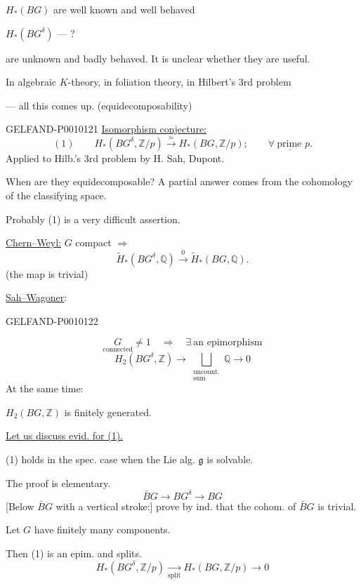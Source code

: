 $H_*(BG)$ are well known and well behaved

$H_*(BG^\delta)$ --- ?

are unknown and badly behaved. It is unclear whether they are useful.

In algebraic $K$-theory, in foliation theory, in Hilbert’s 3rd problem

--- all this comes up. \qquad (equidecomposability)


\begin{GelfandAdjacentEvidence}{GELFAND-P001012}{1}
\underline{Isomorphism conjecture:}
\[
(1)\qquad H_*(BG^\delta,\mathbb Z/p)\overset{\simeq}{\longrightarrow}
H_*(BG,\mathbb Z/p);\qquad \underline{\forall\ \text{prime }p.}
\]
Applied to Hilb.’s 3rd problem by H. Sah, Dupont.

When are they equidecomposable? A partial answer comes from the cohomology of the classifying space.

Probably (1) is a very difficult assertion.

\underline{Chern--Weyl:} $G$ compact $\Rightarrow$
\[
\widetilde H_*(BG^\delta,\mathbb Q)\overset{0}{\longrightarrow}
\widetilde H_*(BG,\mathbb Q).
\]
(the map is trivial)

\underline{Sah--Wagoner}:
\end{GelfandAdjacentEvidence}
\begin{GelfandAdjacentEvidence}{GELFAND-P001012}{2}

\[
\underset{\text{connected}}{G}\ne1
\quad\Rightarrow\quad\exists\ \text{an epimorphism}
\]
\[
H_2(BG^\delta,\mathbb Z)\longrightarrow
\underset{\substack{\text{uncount.}\\\text{sum}}}{\bigsqcup}\mathbb Q\longrightarrow0
\]
At the same time:
\par $H_2(BG,\mathbb Z)$ is finitely generated.

\underline{Let us discuss evid. for (1).}

(1) holds in the spec. case when the Lie alg. $\mathfrak g$ is solvable.

The proof is elementary.
\[
\bar B G\longrightarrow BG^\delta\longrightarrow BG
\]
[Below $\bar B G$ with a vertical stroke:] prove by ind. that the cohom. of $\bar B G$ is trivial.

Let $G$ have finitely many components.

Then (1) is an epim. and splits.
\[
H_*(BG^\delta,\mathbb Z/p)
\underset{\underline{\mathrm{split}}}{\longrightarrow}
H_*(BG,\mathbb Z/p)\longrightarrow0
\]
\end{GelfandAdjacentEvidence}
